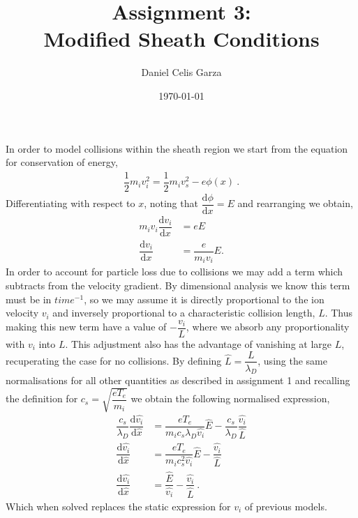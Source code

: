 \documentclass[10pt,a4paper]{article}
\begin{document}
	\title{Assignment 3:\\Modified Sheath Conditions}
	\author{Daniel Celis Garza}
	\date{\today}
	\maketitle
	
	In order to model collisions within the sheath region we start from the equation for conservation of energy,
	\begin{align}
		\dfrac{1}{2} m_{i} v_{i}^{2} = \dfrac{1}{2} m_{i} v_{s}^{2} - e \phi(x)~.
	\end{align}
	Differentiating with respect to $x$, noting that $\dfrac{\mathrm{d} \phi}{\mathrm{d} x} = E$ and rearranging we obtain,
	\begin{align}
		m_{i} v_{i} \dfrac{\mathrm{d} v_{i}}{\mathrm{d} x} &= e E \nonumber\\
		\dfrac{\mathrm{d} v_{i}}{\mathrm{d} x} &= \dfrac{e}{m_{i} v_{i}} E.
	\end{align}
	In order to account for particle loss due to collisions we may add a term which subtracts from the velocity gradient. By dimensional analysis we know this term must be in $time^{-1}$, so we may assume it is directly proportional to the ion velocity $v_{i}$ and inversely proportional to a characteristic collision length, $L$. Thus making this new term have a value of $-\dfrac{v_{i}}{L}$, where we absorb any proportionality with $v_{i}$ into $L$. This adjustment also has the advantage of vanishing at large $L$, recuperating the case for no collisions. By defining $\hat{L} = \dfrac{L}{\lambda_{D}}$, using the same normalisations for all other quantities as described in assignment 1 and recalling the definition for $c_{s} = \sqrt{\dfrac{e T_{e}}{m_{i}}}$ we obtain the following normalised expression,
	\begin{align}
		\dfrac{c_{s}}{\lambda_{D}} \dfrac{\mathrm{d} \hat{v_{i}}}{\mathrm{d} \hat{x}} &= \dfrac{e T_{e}}{m_{i} c_{s} \lambda_{D} \hat{v_{i}}} \hat{E} - \dfrac{c_{s}}{\lambda_{D}} \dfrac{\hat{v_{i}}}{\hat{L}} \nonumber \\
		\dfrac{\mathrm{d} \hat{v_{i}}}{\mathrm{d} \hat{x}} &= \dfrac{e T_{e}}{m_{i} c_{s}^{2} \hat{v_{i}}} \hat{E} - \dfrac{\hat{v_{i}}}{\hat{L}} \nonumber \\
		\dfrac{\mathrm{d} \hat{v_{i}}}{\mathrm{d} \hat{x}} &= \dfrac{\hat{E}}{\hat{v_{i}}} - \dfrac{\hat{v_{i}}}{\hat{L}}~.
	\end{align}
	Which when solved replaces the static expression for $v_{i}$ of previous models.
	
\end{document}
